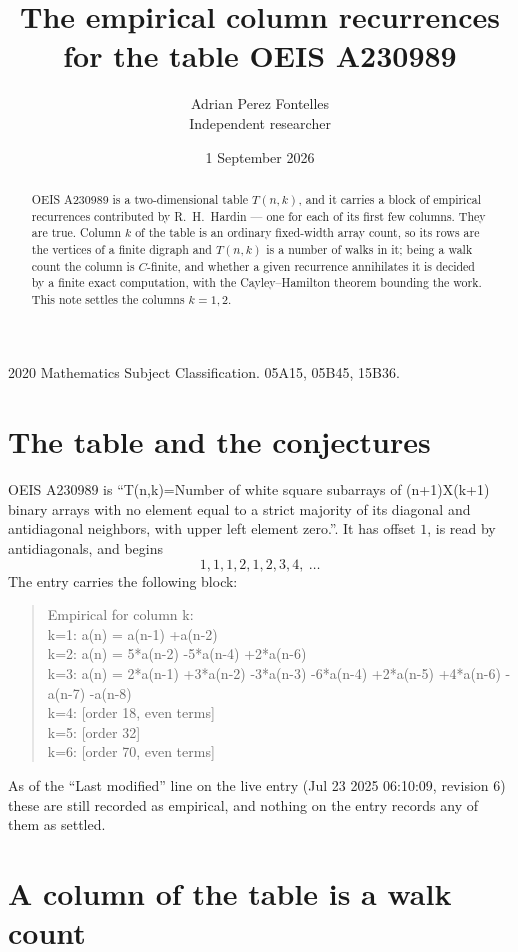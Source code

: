 \documentclass[11pt,a4paper]{article}
\title{The empirical column recurrences for the table OEIS A230989}
\author{Adrian Perez Fontelles\\ \small Independent researcher}
\date{1 September 2026}
\theoremstyle{plain}
\theoremstyle{definition}
\begin{document}
\maketitle

\begin{abstract}
OEIS A230989 is a two-dimensional table $T(n,k)$, and it carries a block of empirical
recurrences contributed by R.~H.~Hardin --- one for each of its first few columns. They are
true. Column $k$ of the table is an ordinary fixed-width array count, so its rows are the
vertices of a finite digraph and $T(n,k)$ is a number of walks in it; being a walk count the
column is $C$-finite, and whether a given recurrence annihilates it is decided by a finite
exact computation, with the Cayley--Hamilton theorem bounding the work. This note settles the columns $k=1, 2$.
\end{abstract}

\noindent\small 2020 Mathematics Subject Classification. 05A15, 05B45, 15B36.\normalsize

\section{The table and the conjectures}

OEIS A230989 is ``T(n,k)=Number of white square subarrays of (n+1)X(k+1) binary arrays with no element equal to a strict majority of its diagonal and antidiagonal neighbors, with upper left element zero.''. It has offset $1$, is
read by antidiagonals, and begins
\[
1, 1, 1, 2, 1, 2, 3, 4,\ \dots
\]
The entry carries the following block:
\begin{quote}\small
Empirical for column k:\\
k=1: a(n) = a(n-1) +a(n-2)\\
k=2: a(n) = 5*a(n-2) -5*a(n-4) +2*a(n-6)\\
k=3: a(n) = 2*a(n-1) +3*a(n-2) -3*a(n-3) -6*a(n-4) +2*a(n-5) +4*a(n-6) -a(n-7) -a(n-8)\\
k=4: [order 18, even terms]\\
k=5: [order 32]\\
k=6: [order 70, even terms]\\
\end{quote}
As of the ``Last modified'' line on the live entry (Jul 23 2025 06:10:09, revision 6) these are still
recorded as empirical, and nothing on the entry records any of them as settled.

\section{A column of the table is a walk count}
\end{document}
